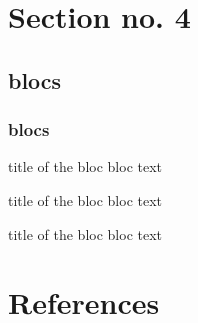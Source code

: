 \documentclass[hyperref={pdfpagelabels=false}]{beamer}
\begin{document}
\section{Section no. 4}
\subsection{blocs}
\begin{frame}
\frametitle{blocs}

\begin{block}{title of the bloc}
bloc text
\end{block}

\begin{exampleblock}{title of the bloc}
bloc text
\end{exampleblock}


\begin{alertblock}{title of the bloc}
bloc text
\end{alertblock}
\end{frame}

\section{References}


\end{document}

